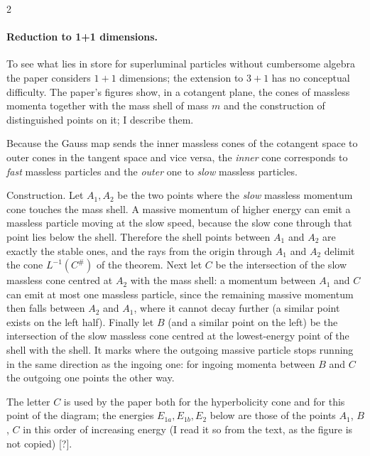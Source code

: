 \begin{paracol}{2}
\paragraph{Reduction to 1+1 dimensions.} To see what lies in store for superluminal particles without cumbersome algebra the paper considers $1+1$ dimensions; the extension to $3+1$ has no conceptual difficulty. The paper's figures show, in a cotangent plane, the cones of massless momenta together with the mass shell of mass $m$ and the construction of distinguished points on it; I describe them.

Because the Gauss map sends the inner massless cones of the cotangent space to outer cones in the tangent space and vice versa, the \emph{inner} cone corresponds to \emph{fast} massless particles and the \emph{outer} one to \emph{slow} massless particles.

Construction. Let $A_1,A_2$ be the two points where the \emph{slow} massless momentum cone touches the mass shell. A massive momentum of higher energy can emit a massless particle moving at the slow speed, because the slow cone through that point lies below the shell. Therefore the shell points between $A_1$ and $A_2$ are exactly the stable ones, and the rays from the origin through $A_1$ and $A_2$ delimit the cone $L^{-1}(C^\#)$ of the theorem. Next let $C$ be the intersection of the slow massless cone centred at $A_2$ with the mass shell: a momentum between $A_1$ and $C$ can emit at most one massless particle, since the remaining massive momentum then falls between $A_2$ and $A_1$, where it cannot decay further (a similar point exists on the left half). Finally let $B$ (and a similar point on the left) be the intersection of the slow massless cone centred at the lowest-energy point of the shell with the shell. It marks where the outgoing massive particle stops running in the same direction as the ingoing one: for ingoing momenta between $B$ and $C$ the outgoing one points the other way.

\begin{coursenote}
The letter $C$ is used by the paper both for the hyperbolicity cone and for this point of the diagram; the energies $E_{1a},E_{1b},E_2$ below are those of the points $A_1$, $B$, $C$ in this order of increasing energy (I read it so from the text, as the figure is not copied) [?].
\end{coursenote}


\end{paracol}
